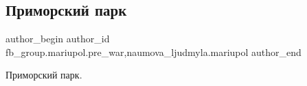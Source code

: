  
 
 
 
 

\subsection{Приморский парк}
\label{sec:17_02_2023.fb.fb_group.mariupol.pre_war.1.primorskii_park}
 
\ifcmt
 author_begin
   author_id fb_group.mariupol.pre_war,naumova_ljudmyla.mariupol
 author_end
\fi

Приморский парк.


